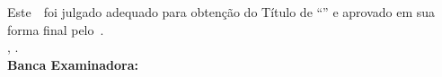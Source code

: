 \imprimircapa

\imprimirfolhaderosto*

\begin{fichacatalografica}
  
\end{fichacatalografica}

\begin{folhadeaprovacao}
  \OnehalfSpacing
  \centering
  \imprimirautor\\%
  \vspace*{10pt}    
  \textbf{\imprimirtitulo}%
  \ifnotempty{\imprimirsubtitulo}{:~\imprimirsubtitulo}\\%
  \vspace*{\baselineskip}
  Este~\imprimirtipotrabalho~foi julgado adequado para obtenção do Título de “\imprimirformacao” e aprovado em sua forma final pelo~\imprimirprograma. \\
    \vspace*{\baselineskip}
  \imprimirlocal, \imprimirdata. \\
  \vspace*{2\baselineskip}
  \vspace*{2\baselineskip}
  \textbf{Banca Examinadora:} \\
  \vspace*{\baselineskip}
  \assinatura{\OnehalfSpacing\imprimirorientador \\ \imprimirorientadorRotulo}
  \assinatura{\OnehalfSpacing\imprimircoorientador \\ \imprimircoorientadorRotulo}
  \vspace*{\baselineskip}

  \vspace*{\baselineskip}
\end{folhadeaprovacao}

